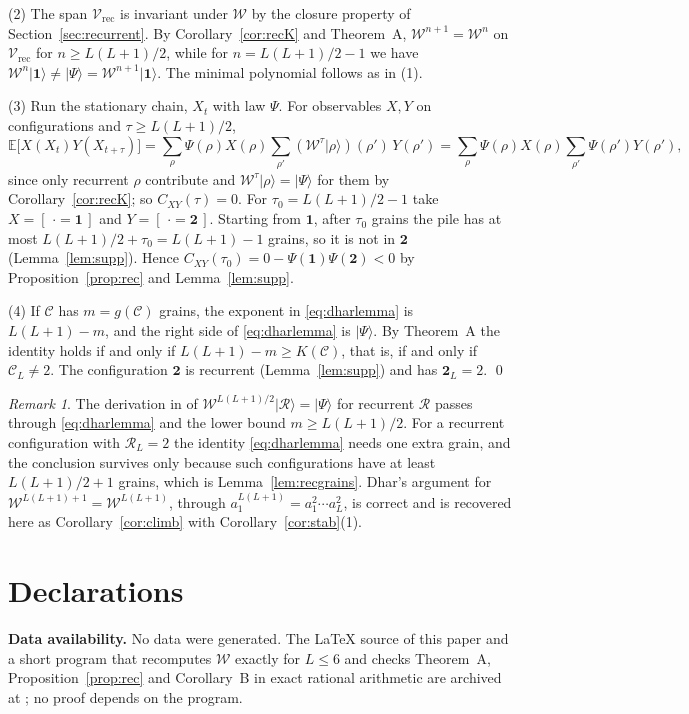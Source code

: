 \documentclass[11pt]{amsart}
\newcommand{\zenodoDOI}{10.5281/zenodo.24123896}
\theoremstyle{definition}
\theoremstyle{remark}
\newtheorem{remark}[theorem]{Remark}
\newcommand{\cV}{\mathcal{V}}
\newcommand{\cW}{\mathcal{W}}
\newcommand{\ket}[1]{|#1\rangle}
\newcommand{\two}{\mathbf{2}}
\newcommand{\one}{\mathbf{1}}
\newcommand{\Ind}[1]{[\,#1\,]}
\begin{document}
(2) The span $\cV_{\mathrm{rec}}$ is invariant under $\cW$ by the closure property of Section~\ref{sec:recurrent}. By Corollary~\ref{cor:recK} and Theorem~A, $\cW^{n+1}=\cW^n$ on $\cV_{\mathrm{rec}}$ for $n\ge L(L+1)/2$, while for $n=L(L+1)/2-1$ we have $\cW^n\ket\one\ne\ket\Psi=\cW^{n+1}\ket\one$. The minimal polynomial follows as in (1).

(3) Run the stationary chain, $X_t$ with law $\Psi$. For observables $X,Y$ on configurations and $\tau\ge L(L+1)/2$,
\[
\mathbb E\bigl[X(X_t)Y(X_{t+\tau})\bigr]=\sum_\rho\Psi(\rho)X(\rho)\sum_{\rho'}(\cW^\tau\ket\rho)(\rho')\,Y(\rho')=\sum_\rho\Psi(\rho)X(\rho)\sum_{\rho'}\Psi(\rho')Y(\rho'),
\]
since only recurrent $\rho$ contribute and $\cW^\tau\ket\rho=\ket\Psi$ for them by Corollary~\ref{cor:recK}; so $C_{XY}(\tau)=0$. For $\tau_0=L(L+1)/2-1$ take $X=\Ind{\,\cdot=\one}$ and $Y=\Ind{\,\cdot=\two}$. Starting from $\one$, after $\tau_0$ grains the pile has at most $L(L+1)/2+\tau_0=L(L+1)-1$ grains, so it is not in $\two$ (Lemma~\ref{lem:supp}). Hence $C_{XY}(\tau_0)=0-\Psi(\one)\Psi(\two)<0$ by Proposition~\ref{prop:rec} and Lemma~\ref{lem:supp}.

(4) If $\mathcal C$ has $m=g(\mathcal C)$ grains, the exponent in \eqref{eq:dharlemma} is $L(L+1)-m$, and the right side of \eqref{eq:dharlemma} is $\ket\Psi$. By Theorem~A the identity holds if and only if $L(L+1)-m\ge K(\mathcal C)$, that is, if and only if $\mathcal C_L\ne2$. The configuration $\two$ is recurrent (Lemma~\ref{lem:supp}) and has $\two_L=2$. \qed

\begin{remark}
The derivation in \cite{Dha04} of $\cW^{L(L+1)/2}\ket{\mathcal R}=\ket\Psi$ for recurrent $\mathcal R$ passes through \eqref{eq:dharlemma} and the lower bound $m\ge L(L+1)/2$. For a recurrent configuration with $\mathcal R_L=2$ the identity \eqref{eq:dharlemma} needs one extra grain, and the conclusion survives only because such configurations have at least $L(L+1)/2+1$ grains, which is Lemma~\ref{lem:recgrains}. Dhar's argument for $\cW^{L(L+1)+1}=\cW^{L(L+1)}$, through $a_1^{L(L+1)}=a_1^2\cdots a_L^2$, is correct and is recovered here as Corollary~\ref{cor:climb} with Corollary~\ref{cor:stab}(1).
\end{remark}

\section*{Declarations}

\noindent\textbf{Data availability.} No data were generated. The \LaTeX{} source of this paper and a short program that recomputes $\cW$ exactly for $L\le6$ and checks Theorem~A, Proposition~\ref{prop:rec} and Corollary~B in exact rational arithmetic are archived at \doi{\zenodoDOI}; no proof depends on the program.
\end{document}
